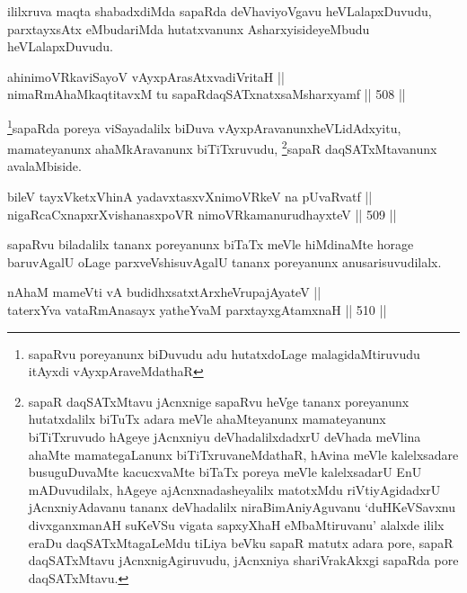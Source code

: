 \begin{artha}
ililxruva maqta shabadxdiMda sapaRda deVhaviyoVgavu heVLalapxDuvudu,
parxtayxsAtx eMbudariMda hutatxvanunx AsharxyisideyeMbudu
heVLalapxDuvudu.
\end{artha}

\begin{shl}
ahinimoVRkaviSayoV vAyxpArasAtxvadiVritaH || \\
nimaRmAhaMkaqtitavxM tu sapaRdaqSATxnatxsaMsharxyamf \hfill || 508 ||  
\end{shl}

\begin{artha}
\footnote{sapaRvu poreyanunx biDuvudu adu hutatxdoLage malagidaMtiruvudu itAyxdi vAyxpAraveMdathaR}sapaRda poreya viSayadalilx biDuva vAyxpAravanunx\break heVLidAdxyitu, mamateyanunx ahaMkAravanunx biTiTxruvudu, \footnote{sapaR daqSATxMtavu jAcnxnige sapaRvu heVge tananx poreyanunx hutatxdalilx biTuTx adara meVle ahaMteyanunx mamateyanunx biTiTxruvudo hAgeye jAcnxniyu deVhadalilxdadxrU deVhada meVlina ahaMte mamategaLanunx biTiTxruvaneMdathaR, hAvina meVle kalelxsadare busuguDuvaMte kacucxvaMte biTaTx poreya meVle kalelxsadarU EnU mADuvudilalx, hAgeye ajAcnxnadasheyalilx matotxMdu riVtiyAgidadxrU jAcnxniyAdavanu tananx deVhadalilx niraBimAniyAguvanu `duHKeVSavxnu divxganxmanAH suKeVSu vigata sapxyXhaH eMbaMtiruvanu' alalxde ililx eraDu daqSATxMtagaLeMdu tiLiya beVku sapaR matutx adara pore, sapaR daqSATxMtavu jAcnxnigAgiruvudu,  jAcnxniya shariVrakAkxgi sapaRda pore daqSATxMtavu.}sapaR daqSATxMtavanunx avalaMbiside.
\end{artha}

\begin{shl}
bileV tayxVketxV\s hinA yadavxtasxvXnimoVRkeV na pUvaRvatf || \\
nigaRcaCxnapxrXvishanasxpoVR nimoVRkamanurudhayxteV \hfill || 509 ||  
\end{shl}

\begin{artha}
sapaRvu biladalilx tananx poreyanunx biTaTx meVle hiMdinaMte horage
baruvAgalU oLage parxveVshisuvAgalU tananx poreyanunx
anusarisuvudilalx.
\end{artha}


\begin{shl}
nAhaM mameVti vA budidhxsatxtArxheVrupajAyateV || \\
taterxYva vataRmAnasayx yatheYvaM parxtayxgAtamxnaH \hfill || 510 ||  
\end{shl}


